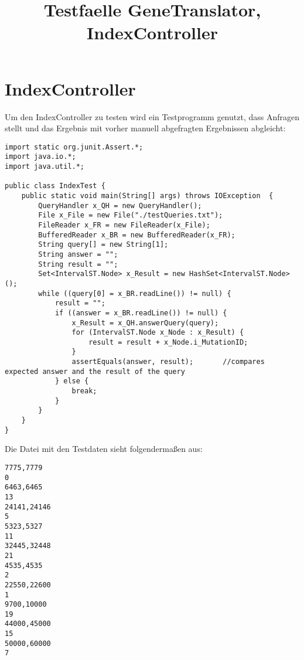 \documentclass[]{article}
\title{Testfaelle GeneTranslator, IndexController}
\author{}
\begin{document}
\maketitle

\section{IndexController}
Um den IndexController zu testen wird ein Testprogramm genutzt, dass Anfragen stellt und das Ergebnis mit vorher manuell abgefragten Ergebnissen abgleicht:
\begin{verbatim}
import static org.junit.Assert.*;
import java.io.*;
import java.util.*;

public class IndexTest {
	public static void main(String[] args) throws IOException  {
		QueryHandler x_QH = new QueryHandler();
		File x_File = new File("./testQueries.txt");
		FileReader x_FR = new FileReader(x_File);
      	BufferedReader x_BR = new BufferedReader(x_FR);
      	String query[] = new String[1];
      	String answer = "";
      	String result = "";
      	Set<IntervalST.Node> x_Result = new HashSet<IntervalST.Node>();
      	while ((query[0] = x_BR.readLine()) != null) {
      		result = "";
      		if ((answer = x_BR.readLine()) != null) {
      			x_Result = x_QH.answerQuery(query);
      			for (IntervalST.Node x_Node : x_Result) {
      				result = result + x_Node.i_MutationID;
    			}
    			assertEquals(answer, result);		//compares expected answer and the result of the query
      		} else {
      			break;
      		}
      	}
	}
}
\end{verbatim}
Die Datei mit den Testdaten sieht folgendermaßen aus:
\begin{verbatim}
7775,7779
0
6463,6465
13
24141,24146
5
5323,5327
11
32445,32448
21
4535,4535
2
22550,22600
1
9700,10000
19
44000,45000
15
50000,60000
7
\end{verbatim}
\newpage
\end{document}
